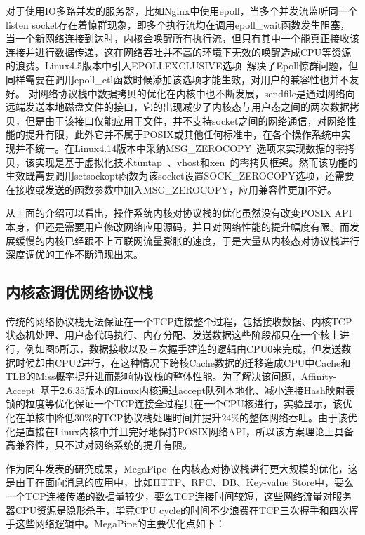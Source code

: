 对于使用IO多路并发的服务器，比如Nginx中使用epoll，当多个并发流监听同一个listen socket存在着惊群现象，即多个执行流均在调用epoll\_wait函数发生阻塞，当一个新网络连接到达时，内核会唤醒所有执行流，但只有其中一个能真正接收该连接并进行数据传递，这在网络吞吐并不高的环境下无效的唤醒造成CPU等资源的浪费。Linux4.5版本中引入EPOLLEXCLUSIVE选项~\cite{EPOLLEXCLUSIVE}解决了Epoll惊群问题，但同样需要在调用epoll\_ctl函数时候添加该选项才能生效，对用户的兼容性也并不友好。
对网络协议栈中数据拷贝的优化在内核中也不断发展，sendfile是通过网络向远端发送本地磁盘文件的接口，它的出现减少了内核态与用户态之间的两次数据拷贝，但是由于该接口仅能应用于文件，并不支持socket之间的网络通信，对网络性能的提升有限，此外它并不属于POSIX或其他任何标准中，在各个操作系统中实现并不统一。在Linux4.14版本中采纳MSG\_ZEROCOPY~\cite{msg_zerocopy}选项来实现数据的零拷贝，该实现是基于虚拟化技术tuntap~\cite{tuntap}、vhost和xen~\cite{Xen}的零拷贝框架。然而该功能的生效既需要调用setsockopt函数为该socket设置SOCK\_ZEROCOPY选项，还需要在接收或发送的函数参数中加入MSG\_ZEROCOPY，应用兼容性更加不好。

从上面的介绍可以看出，操作系统内核对协议栈的优化虽然没有改变POSIX API本身，但还是需要用户修改网络应用源码，并且对网络性能的提升幅度有限。而发展缓慢的内核已经跟不上互联网流量膨胀的速度，于是大量从内核态对协议栈进行深度调优的工作不断涌现出来。

\subsection{内核态调优网络协议栈}

传统的网络协议栈无法保证在一个TCP连接整个过程，包括接收数据、内核TCP状态机处理、用户态代码执行、内存分配、发送数据这些阶段都只在一个核上进行，例如图5所示，数据接收以及三次握手建连的逻辑由CPU0来完成，但发送数据时候却由CPU2进行，在这种情况下跨核Cache数据的迁移造成CPU中Cache和TLB的Miss概率提升进而影响协议栈的整体性能。为了解决该问题，Affinity-Accept~\cite{Affinity-Accept}基于2.6.35版本的Linux内核通过accept队列本地化、减小连接Hash映射表锁的粒度等优化保证一个TCP连接全过程只在一个CPU核进行，实验显示，该优化在单核中降低30\%的TCP协议栈处理时间并提升24\%的整体网络吞吐。由于该优化是直接在Linux内核中并且完好地保持POSIX网络API，所以该方案理论上具备高兼容性，只不过对网络系统的提升有限。

作为同年发表的研究成果，MegaPipe~\cite{MegaPipe}在内核态对协议栈进行更大规模的优化，这是由于在面向消息的应用中，比如HTTP、RPC、DB、Key-value Store中，要么一个TCP连接传递的数据量较少，要么TCP连接时间较短，这些网络流量对服务器CPU资源是隐形杀手，毕竟CPU cycle的时间不少浪费在TCP三次握手和四次挥手这些网络逻辑中。MegaPipe的主要优化点如下：

